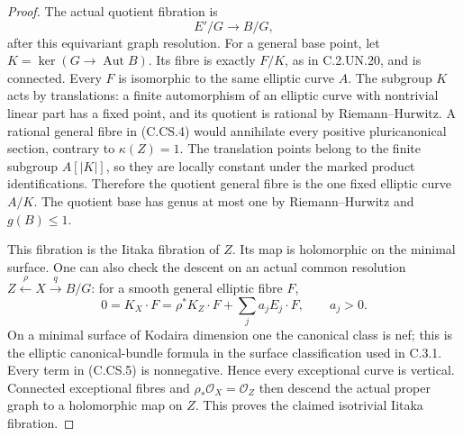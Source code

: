\begin{proof}
The actual quotient fibration is
\[
                   E'/G\longrightarrow B/G,
                                                               \tag{C.CS.4}
\]
after this equivariant graph resolution.
For a general base point, let
$K=\ker(G\to\operatorname{Aut}B)$.
Its fibre is exactly $F/K$, as in C.2.UN.20,
and is connected. Every $F$ is isomorphic
to the same elliptic curve $A$.
The subgroup $K$ acts by translations:
a finite automorphism of an elliptic curve
with nontrivial linear part has a fixed
point, and its quotient is rational by
Riemann--Hurwitz. A rational general fibre
in (C.CS.4) would annihilate every positive
pluricanonical section, contrary to
$\kappa(Z)=1$. The translation points
belong to the finite subgroup $A[|K|]$,
so they are locally constant under the
marked product identifications. Therefore
the quotient general fibre is the one
fixed elliptic curve $A/K$.
The quotient base has genus at most one
by Riemann--Hurwitz and $g(B)\le1$.

This fibration is the Iitaka fibration
of $Z$. Its map is holomorphic on the
minimal surface. One can also check the
descent on an actual common resolution
$Z\xleftarrow{\rho}X\xrightarrow q B/G$:
for a smooth general elliptic fibre $F$,
\[
 0=K_X\cdot F
   =\rho^*K_Z\cdot F+\sum_j a_jE_j\cdot F,
                   \qquad a_j>0.
                                                               \tag{C.CS.5}
\]
On a minimal surface of Kodaira dimension
one the canonical class is nef; this is
the elliptic canonical-bundle formula
in the surface classification used in
C.3.1. Every term in (C.CS.5) is
nonnegative. Hence every exceptional
curve is vertical. Connected exceptional
fibres and $\rho_*\mathcal O_X=\mathcal O_Z$
then descend the actual proper graph to
a holomorphic map on $Z$. This proves
the claimed isotrivial Iitaka fibration.


\end{proof}

